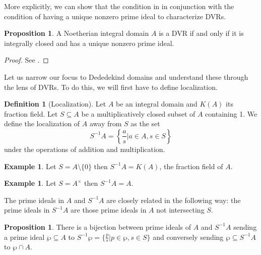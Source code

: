 \documentclass{amsart}
\theoremstyle{definition}
\newtheorem{example}[theorem]{Example}
\newtheorem{proposition}[theorem]{Proposition}
\newtheorem{definition}[theorem]{Definition}
\numberwithin{equation}{section}
\begin{document}
More explicitly, we can show that the condition in  in conjunction with the condition of having a unique nonzero prime ideal to characterize DVRs. 
\begin{proposition}\label{prop:DVR iff integrally closed and unique nonzero prime}
  A Noetherian integral domain $A$ is a DVR if and only if it is integrally closed and has a unique nonzero prime ideal. 
\end{proposition}
\begin{proof}
  See \cite[Ch. 1, \S 2, Prop. 3]{Serre}. 
\end{proof}
Let us narrow our focus to Dededekind domains and understand these through the lens of DVRs. To do this, we will first have to define localization. 
\begin{definition}[Localization]
  Let $A$ be an integral domain and $K(A)$ its fraction field. Let $S\subseteq A$ be a multiplicatively closed subset of $A$ containing 1. We define the localization of $A$ away from $S$ as the set 
  $$S^{-1}A=\left\{\frac{a}{s}|a\in A, s\in S\right\}$$
  under the operations of addition and multiplication.
\end{definition}
\begin{example}
  Let $S=A\setminus\{0\}$ then $S^{-1}A=K(A)$, the fraction field of $A$. 
\end{example}
\begin{example}
  Let $S=A^{\times}$ then $S^{-1}A=A$. 
\end{example}
The prime ideals in $A$ and $S^{-1}A$ are closely related in the following way: the prime ideals in $S^{-1}A$ are those prime ideals in $A$ not intersecting $S$. 
\begin{proposition}\label{prop:localization correspondence}
  There is a bijection between prime ideals of $A$ and $S^{-1}A$ sending a prime ideal $\wp\subseteq A$ to $S^{-1}\wp=\{\frac{p}{s}|p\in\wp,s\in S\}$ and conversely sending $\wp\subseteq S^{-1}A$ to $\wp\cap A$. 
\end{proposition}
\end{document}
